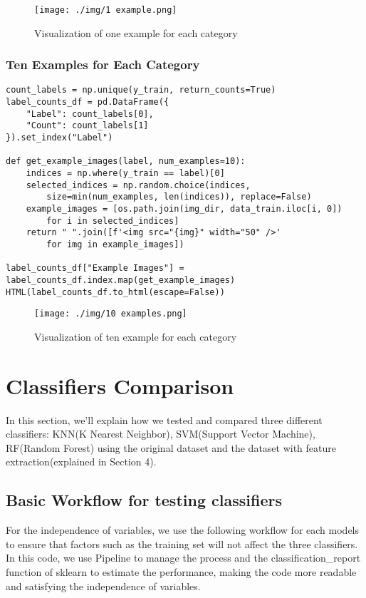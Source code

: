 \documentclass[a4paper,11pt]{article}
\begin{document}
\begin{figure}[H]
    \centering
    \texttt{[image: ./img/1 example.png]}
    \caption[Label count]{Visualization of one example for each category}
    \label{fig:example}
\end{figure}

\subsubsection{Ten Examples for Each Category}
\begin{listing}[!ht]
\begin{verbatim}
count_labels = np.unique(y_train, return_counts=True)
label_counts_df = pd.DataFrame({
    "Label": count_labels[0],
    "Count": count_labels[1]
}).set_index("Label")

def get_example_images(label, num_examples=10):
    indices = np.where(y_train == label)[0]
    selected_indices = np.random.choice(indices, 
        size=min(num_examples, len(indices)), replace=False)
    example_images = [os.path.join(img_dir, data_train.iloc[i, 0]) 
        for i in selected_indices]
    return " ".join([f'<img src="{img}" width="50" />' 
        for img in example_images])

label_counts_df["Example Images"] =                               
label_counts_df.index.map(get_example_images)
HTML(label_counts_df.to_html(escape=False))
\end{verbatim}
\label{listing:python}
\end{listing}

\begin{figure}[H]
    \centering
    \texttt{[image: ./img/10 examples.png]}
    \caption[Label count]{Visualization of ten example for each category}
    \label{fig:example}
\end{figure}
\section{Classifiers Comparison}
In this section, we'll explain how we tested and compared three different classifiers: KNN(K Nearest Neighbor), SVM(Support Vector Machine), RF(Random Forest) using the original dataset and the dataset with feature extraction(explained in Section 4).

\subsection{Basic Workflow for testing classifiers}
For the independence of variables, we use the following workflow for each models to ensure that factors such as the training set will not affect the three classifiers. 
\\
In this code, we use Pipeline to manage the process and the classification\_report function of sklearn to estimate the performance, making the code more readable and satisfying the independence of variables.
\end{document}
